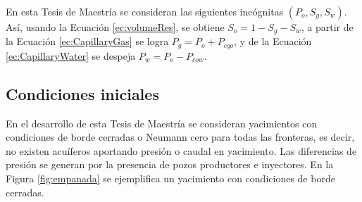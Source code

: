 En esta Tesis de Maestría se consideran las siguientes incógnitas $\left(P_{o}, S_{g}, S_{w}\right)$. Así, usando la Ecuación \ref{ec:volumeRes}, se obtiene $S_{o} = 1 - S_{g} - S_{w}$, a partir de la Ecuación \ref{ec:CapillaryGas} se logra $P_{g} = P_{o} + P_{cgo}$, y de la Ecuación \ref{ec:CapillaryWater} se despeja $P_{w} = P_{o} - P_{cow}$.





\subsection{Condiciones iniciales}\label{subsec:InitialCond}

En el desarrollo de esta Tesis de Maestría se consideran yacimientos con condiciones de borde cerradas o Neumann cero para todas las fronteras, es decir, no existen acuíferos aportando presión o caudal en yacimiento. Las diferencias de presión se generan por la presencia de pozos productores e inyectores. En la Figura \ref{fig:empanada} se ejemplifica un yacimiento con condiciones de borde cerradas.\\

